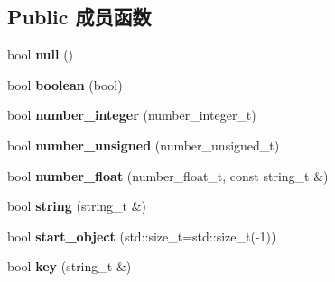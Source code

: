 \subsection*{Public 成员函数}
\begin{DoxyCompactItemize}
\item 
\mbox{\label{classnlohmann_1_1detail_1_1json__sax__acceptor_ad7ad55168af6e03ed8b844c94a17b9ce}} 
bool {\bfseries null} ()
\item 
\mbox{\label{classnlohmann_1_1detail_1_1json__sax__acceptor_a3f5fe42a9b195de8d251d6d98d5ee92c}} 
bool {\bfseries boolean} (bool)
\item 
\mbox{\label{classnlohmann_1_1detail_1_1json__sax__acceptor_a976bf4ce6e9a2ffe48f683ddff80af00}} 
bool {\bfseries number\+\_\+integer} (number\+\_\+integer\+\_\+t)
\item 
\mbox{\label{classnlohmann_1_1detail_1_1json__sax__acceptor_ad15b288f3351287edbe289502f595491}} 
bool {\bfseries number\+\_\+unsigned} (number\+\_\+unsigned\+\_\+t)
\item 
\mbox{\label{classnlohmann_1_1detail_1_1json__sax__acceptor_aebf8800023eb20d472f111f86b189e60}} 
bool {\bfseries number\+\_\+float} (number\+\_\+float\+\_\+t, const string\+\_\+t \&)
\item 
\mbox{\label{classnlohmann_1_1detail_1_1json__sax__acceptor_aaa69255e757a6ecc4403a2aa4931fc60}} 
bool {\bfseries string} (string\+\_\+t \&)
\item 
\mbox{\label{classnlohmann_1_1detail_1_1json__sax__acceptor_a822bbca11a9fea0aa337018e351755f5}} 
bool {\bfseries start\+\_\+object} (std\+::size\+\_\+t=std\+::size\+\_\+t(-\/1))
\item 
\mbox{\label{classnlohmann_1_1detail_1_1json__sax__acceptor_a59e1ea5e9c8d25346a564bf9287a5c2a}} 
bool {\bfseries key} (string\+\_\+t \&)

\end{DoxyCompactItemize}
